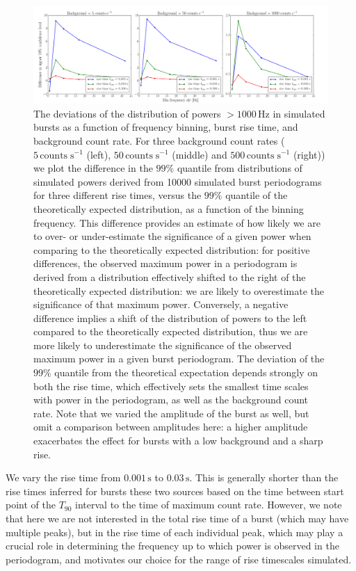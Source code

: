 \documentclass[numberedappendix]{emulateapj}
\newcommand{\hz}{\,\mathrm{Hz}}
\begin{document}
\begin{figure}[htbp]
\begin{center}
\includegraphics[width=18cm]{f5.pdf}
\caption{The deviations of the distribution of powers $>1000 \hz$ in simulated bursts as a function of frequency binning, burst rise time, and background count rate. For three background count rates ($5 \, \mathrm{counts} \; \mathrm{s}^{-1}$ (left), $50 \, \mathrm{counts} \; \mathrm{s}^{-1}$ (middle) and $500 \, \mathrm{counts} \; \mathrm{s}^{-1}$ (right)) we plot the difference in the $99\%$ quantile from distributions of simulated powers derived from 10000 simulated burst periodograms for three different rise times, versus the $99\%$ quantile of the theoretically expected distribution, as a function of the binning frequency. This difference provides an estimate of how likely we are to over- or under-estimate the significance of a given power when comparing to the theoretically expected distribution: for positive differences, the observed maximum power in a periodogram is derived from a distribution effectively shifted to the right of the theoretically expected distribution: we are likely to overestimate the significance of that maximum power. Conversely, a negative difference implies a shift of the distribution of powers to the left compared to the theoretically expected distribution, thus we are more likely to underestimate the significance of the observed maximum power in a given burst periodogram. The deviation of the $99\%$ quantile from the theoretical expectation depends strongly on both the rise time, which effectively sets the smallest time scales with power in the periodogram, as well as the background count rate. Note that we varied the amplitude of the burst as well, but omit a comparison between amplitudes here: a higher amplitude exacerbates the effect for bursts with a low background and a sharp rise.}
\label{fig:weak_bursts}
\end{center}
\end{figure}



We vary the rise time from $0.001 \, \mathrm{s}$ to $0.03 \, \mathrm{s}$. This is generally shorter than the rise times inferred for bursts these two sources based on the time between start point of the $T_{90}$ interval to the time of maximum count rate. However, we note that here we are not interested in the total rise time of a burst (which may have multiple peaks), but in the rise time of each individual peak, which may play a crucial role in determining the frequency up to which power is observed in the periodogram, and motivates our choice for the range of rise timescales simulated. 
\end{document}
